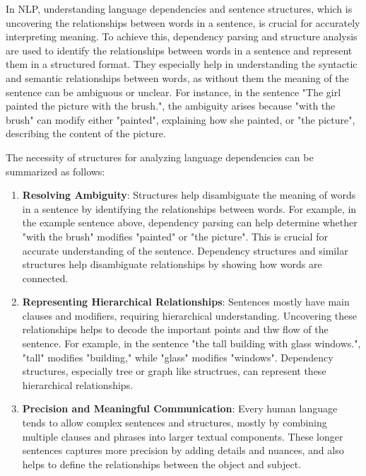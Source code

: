 \documentclass[12pt]{article}
\begin{document}
\begin{description}
  In NLP, understanding language dependencies and sentence structures, which is uncovering the relationships between words in a sentence, is crucial for accurately interpreting
  meaning. To achieve this, dependency parsing and structure analysis are used to identify the relationships between words in a sentence and represent them in a structured format.
  They especially help in understanding the syntactic and semantic relationships between words, as without them the meaning of the sentence can be ambiguous or unclear. For 
  instance, in the sentence "The girl painted the picture with the brush.", the ambiguity arises because "with the brush" can modify either "painted", explaining how she painted,
  or "the picture", describing the content of the picture.

  The necessity of structures for analyzing language dependencies can be summarized as follows:

  \begin{enumerate}
    \item \textbf{Resolving Ambiguity}: Structures help disambiguate the meaning of words in a sentence by identifying the relationships between words. For example, in the example
    sentence above, dependency parsing can help determine whether "with the brush" modifies "painted" or "the picture". This is crucial for accurate understanding of the sentence.
    Dependency structures and similar structures help disambiguate relationships by showing how words are connected.

    \item \textbf{Representing Hierarchical Relationships}: Sentences mostly have main clauses and modifiers, requiring hierarchical understanding. Uncovering these relationships
    helps to decode the important points and thw flow of the sentence. For example, in the sentence "the tall building with glass windows.", "tall" modifies "building," while "glass" 
    modifies "windows". Dependency structures, especially tree or graph like structrues, can represent these hierarchical relationships.

    \item \textbf{Precision and Meaningful Communication}: Every human language tends to allow complex sentences and structures, mostly by combining multiple clauses and phrases
    into larger textual components. These longer sentences captures more precision by adding details and nuances, and also helps to define the relationships between the object and subject.
    
  \end{enumerate}


\end{description}
\end{document}
